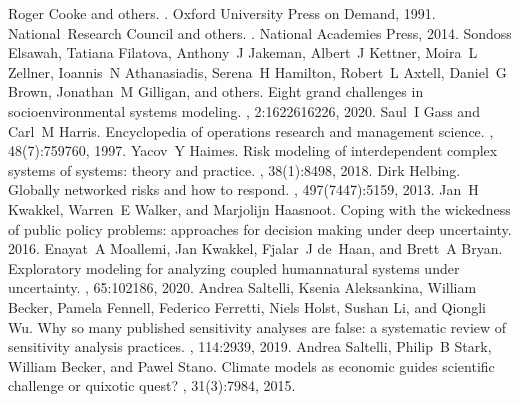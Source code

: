 \documentclass[letterpaper,10pt,english]{sphinxmanual}
\begin{document}
\begin{sphinxthebibliography}{10}
\sphinxAtStartPar
Roger Cooke and others. . Oxford University Press on Demand, 1991.
\sphinxAtStartPar
National Research Council and others. . National Academies Press, 2014.
\sphinxAtStartPar
Sondoss Elsawah, Tatiana Filatova, Anthony J Jakeman, Albert J Kettner, Moira L Zellner, Ioannis N Athanasiadis, Serena H Hamilton, Robert L Axtell, Daniel G Brown, Jonathan M Gilligan, and others. Eight grand challenges in socio\sphinxhyphen{}environmental systems modeling. , 2:16226\textendash{}16226, 2020.
\sphinxAtStartPar
Saul I Gass and Carl M Harris. Encyclopedia of operations research and management science. , 48(7):759\textendash{}760, 1997.
\sphinxAtStartPar
Yacov Y Haimes. Risk modeling of interdependent complex systems of systems: theory and practice. , 38(1):84\textendash{}98, 2018.
\sphinxAtStartPar
Dirk Helbing. Globally networked risks and how to respond. , 497(7447):51\textendash{}59, 2013.
\sphinxAtStartPar
Jan H Kwakkel, Warren E Walker, and Marjolijn Haasnoot. Coping with the wickedness of public policy problems: approaches for decision making under deep uncertainty. 2016.
\sphinxAtStartPar
Enayat A Moallemi, Jan Kwakkel, Fjalar J de Haan, and Brett A Bryan. Exploratory modeling for analyzing coupled human\sphinxhyphen{}natural systems under uncertainty. , 65:102186, 2020.
\sphinxAtStartPar
Andrea Saltelli, Ksenia Aleksankina, William Becker, Pamela Fennell, Federico Ferretti, Niels Holst, Sushan Li, and Qiongli Wu. Why so many published sensitivity analyses are false: a systematic review of sensitivity analysis practices. , 114:29\textendash{}39, 2019.
\sphinxAtStartPar
Andrea Saltelli, Philip B Stark, William Becker, and Pawel Stano. Climate models as economic guides scientific challenge or quixotic quest? , 31(3):79\textendash{}84, 2015.

\end{sphinxthebibliography}
\end{document}
